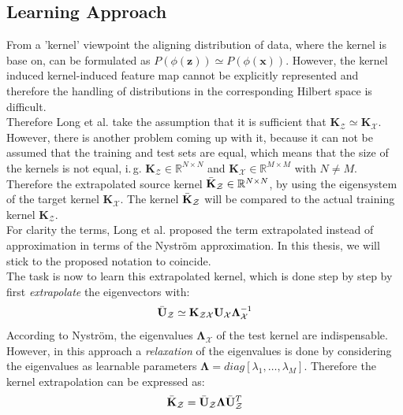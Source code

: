 \subsection{Learning Approach}\label{InSubSecLearnApp}
From a 'kernel' viewpoint the aligning distribution of data, where the kernel is base on, can be formulated as $P(\phi(\mathbf{z})) \simeq P(\phi(\mathbf{x}))$.\cite{Long.2015}
However, the kernel induced kernel-induced feature map cannot be explicitly represented and therefore the handling of distributions in the corresponding Hilbert space is difficult.\cite{KaiZhang.2013}\\
Therefore Long et al. take the assumption that it is sufficient that $\mathbf{K}_\mathcal{Z} \simeq \mathbf{K}_\mathcal{X}$.
However, there is another problem coming up with it, because it can not be assumed that the training and test sets are equal, which means that the size of the kernels is not equal, i.\,g. $\mathbf{K}_\mathcal{Z} \in \mathbb{R}^{N\times N}$ and $\mathbf{K}_\mathcal{X} \in \mathbb{R}^{M\times M}$ with $N \neq M$.
Therefore the extrapolated source kernel $\bar{\mathbf{K}}_\mathcal{Z} \in \mathbb{R}^{N\times N}$, by using the eigensystem of the target kernel $\mathbf{K}_\mathcal{X}$. The kernel  $\bar{\mathbf{K}}_\mathcal{Z} $ will be compared to the actual training kernel $\mathbf{K}_\mathcal{Z}$.\cite{Long.2015}\\
For clarity the terms, Long et al. proposed the term extrapolated instead of approximation in terms of the Nyström approximation.\cite{Long.2015}
In this thesis, we will stick to the proposed notation to coincide.\\
The task is now to learn this extrapolated kernel, which is done step by step by first \textit{extrapolate} the eigenvectors with:\cite{Long.2015}
\begin{equation}\label{EqExtraEigs}
	\bar{\mathbf{U}}_\mathcal{Z} \simeq \mathbf{K}_\mathcal{ZX}\mathbf{U}_\mathcal{X} \boldsymbol{\Lambda}_\mathcal{X}^{-1}
\end{equation}
According to Nyström, the eigenvalues $\boldsymbol{\Lambda}_\mathcal{X}$ of the test kernel are indispensable.
However, in this approach a \textit{relaxation} of the eigenvalues is done by considering the eigenvalues as learnable parameters $\boldsymbol{\Lambda} = diag[\lambda_1,\dots,\lambda_{M}]$.
Therefore the kernel extrapolation can be expressed as:\cite{Long.2015}
\begin{equation}
	\bar{\mathbf{K}}_\mathcal{Z} = \bar{\mathbf{U}}_\mathcal{Z} \boldsymbol{\Lambda} \bar{\mathbf{U}}_\mathcal{Z}^T
\end{equation}

